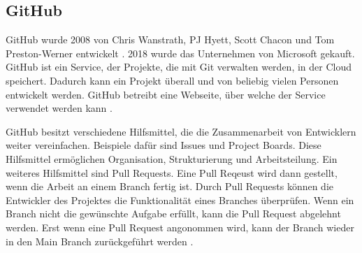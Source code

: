 \subsection{GitHub}\label{sub:t_git_gh}
GitHub wurde 2008 von Chris Wanstrath, PJ Hyett, Scott Chacon und Tom
Preston-Werner entwickelt \cite{noauthor_github_2021}. 2018 wurde das
Unternehmen von Microsoft gekauft. GitHub ist ein Service, der Projekte, die mit
Git verwalten werden, in der Cloud speichert. Dadurch kann ein Projekt überall
und von beliebig vielen Personen entwickelt werden. GitHub betreibt eine
Webseite, über welche der Service verwendet werden kann
\cite{noauthor_github_2021}.

GitHub besitzt verschiedene Hilfsmittel, die die Zusammenarbeit von Entwicklern
weiter vereinfachen. Beispiele dafür sind Issues und Project Boards. Diese
Hilfsmittel ermöglichen Organisation, Strukturierung und Arbeitsteilung. Ein
weiteres Hilfsmittel sind Pull Requests. Eine Pull Reqeust wird dann gestellt,
wenn die Arbeit an einem Branch fertig ist. Durch Pull Requests können die
Entwickler des Projektes die Funktionalität eines Branches überprüfen. Wenn ein
Branch nicht die gewünschte Aufgabe erfüllt, kann die Pull Request abgelehnt
werden. Erst wenn eine Pull Request angonommen wird, kann der Branch wieder in
den Main Branch zurückgeführt werden \cite{atlassian_pull_nodate}.

